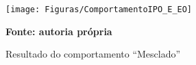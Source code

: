 \begin{figure}[!ht]
\centering
\caption{Resultado do comportamento ``Mesclado''}
\label{fig:resultadoImplementadoMesclado}
		\centering
		\texttt{[image: Figuras/ComportamentoIPO\_E\_EO]}%

	\textbf{Fonte: autoria própria}
\end{figure}